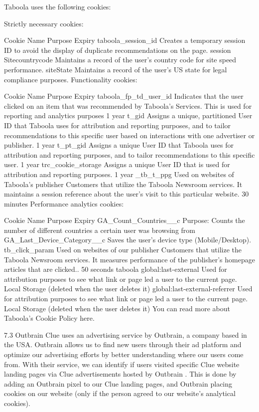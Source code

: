 Taboola uses the following cookies:

Strictly necessary cookies:

Cookie Name	Purpose	Expiry
taboola_session_id	Creates a temporary session ID to avoid the display of duplicate recommendations on the page.	session
Sitecountrycode	Maintains a record of the user’s country code for site speed performance.	
siteState	Maintains a record of the user’s US state for legal compliance purposes.	
Functionality cookies:

Cookie Name	Purpose	Expiry
taboola_fp_td_user_id	Indicates that the user clicked on an item that was recommended by Taboola’s Services. This is used for reporting and analytics purposes	1 year
t_gid	Assigns a unique, partitioned User ID that Taboola uses for attribution and reporting purposes, and to tailor recommendations to this specific user based on interactions with one advertiser or publisher.	1 year
t_pt_gid	Assigns a unique User ID that Taboola uses for attribution and reporting purposes, and to tailor recommendations to this specific user.	1 year
trc_cookie_storage	Assigns a unique User ID that is used for attribution and reporting purposes.	1 year
_tb_t_ppg	Used on websites of Taboola’s publisher Customers that utilize the Taboola Newsroom services. It maintains a session reference about the user’s visit to this particular website.	30 minutes
Performance analytics cookies:

Cookie Name	Purpose	Expiry
GA_Count_Countries__c	Purpose: Counts the number of different countries a certain user was browsing from	
GA_Last_Device_Category__c	Saves the user’s device type (Mobile/Desktop).	
tb_click_param	Used on websites of our publisher Customers that utilize the Taboola Newsroom services. It measures performance of the publisher’s homepage articles that are clicked..	50 seconds
taboola global:last-external	Used for attribution purposes to see what link or page led a user to the current page.	Local Storage (deleted when the user deletes it)
global:last-external-referrer	Used for attribution purposes to see what link or page led a user to the current page.	Local Storage (deleted when the user deletes it)
You can read more about Taboola’s Cookie Policy here.

7.3 Outbrain
Clue uses an advertising service by Outbrain, a company based in the USA. Outbrain allows us to find new users through their ad platform and optimize our advertising efforts by better understanding where our users come from. With their service, we can identify if users visited specific Clue website landing pages via Clue advertisements hosted by Outbrain . This is done by adding an Outbrain pixel to our Clue landing pages, and Outbrain placing cookies on our website (only if the person agreed to our website’s analytical cookies).

